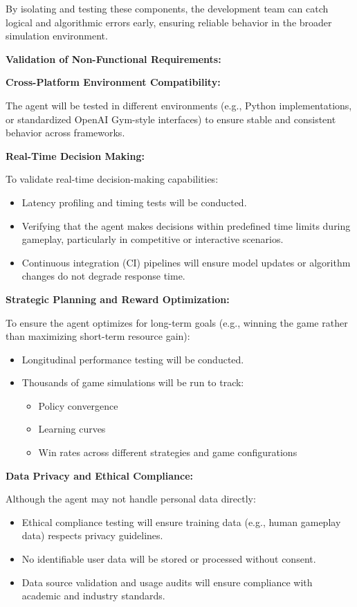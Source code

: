 \documentclass{article}
\begin{document}
By isolating and testing these components, the development team can catch logical and algorithmic errors early, ensuring reliable behavior in the broader simulation environment.

\noindent\textbf{Validation of Non-Functional Requirements:}

\noindent\textbf{Cross-Platform Environment Compatibility:}

The agent will be tested in different \emph{\Catan{}} environments (e.g., Python implementations, or standardized OpenAI Gym-style interfaces) to ensure stable and consistent behavior across frameworks.

\noindent\textbf{Real-Time Decision Making:}

To validate real-time decision-making capabilities:
\begin{itemize}
    \item Latency profiling and timing tests will be conducted.
    \item Verifying that the agent makes decisions within predefined time limits during gameplay, particularly in competitive or interactive scenarios.
    \item Continuous integration (CI) pipelines will ensure model updates or algorithm changes do not degrade response time.
\end{itemize}

\noindent\textbf{Strategic Planning and Reward Optimization:}

To ensure the \RL{} agent optimizes for long-term goals (e.g., winning the game rather than maximizing short-term resource gain):
\begin{itemize}
    \item Longitudinal performance testing will be conducted.
    \item Thousands of game simulations will be run to track:
    \begin{itemize}
        \item Policy convergence
        \item Learning curves
        \item Win rates across different strategies and game configurations
    \end{itemize}
\end{itemize}

\noindent\textbf{Data Privacy and Ethical Compliance:}

Although the \RL{} agent may not handle personal data directly:
\begin{itemize}
    \item Ethical compliance testing will ensure training data (e.g., human gameplay data) respects privacy guidelines.
    \item No identifiable user data will be stored or processed without consent.
    \item Data source validation and usage audits will ensure compliance with academic and industry standards.
\end{itemize}
\end{document}
